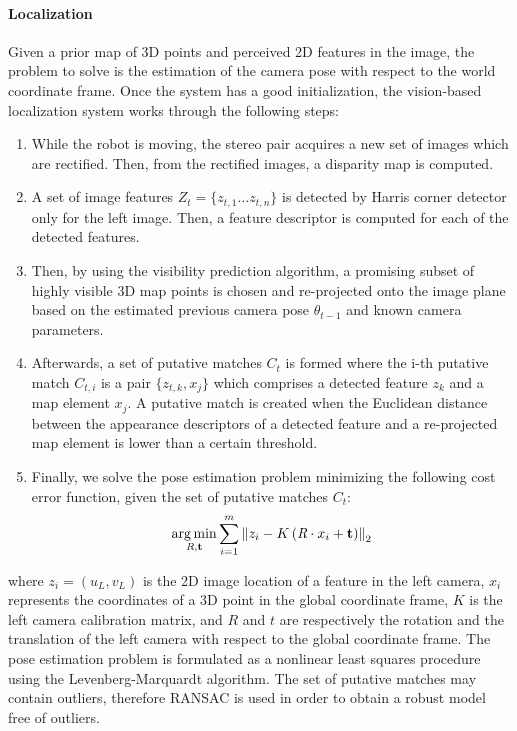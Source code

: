 \paragraph{Localization}
Given a prior map of 3D points and perceived 2D features in the image,
the problem to solve is the estimation of the camera pose with respect
to the world coordinate frame. Once the system has a good
initialization, the vision-based localization system works through the
following steps:
%
\begin{enumerate}
\item While the robot is moving, the stereo pair acquires a new set of images which are rectified. Then, from the rectified images, a disparity map is computed.
\item A set of image features $Z_{t}=\{z_{t,1} \ldots z_{t,n}\}$ is detected by Harris corner detector only for the left image. Then, a feature descriptor is computed for each of the detected features.
\item Then, by using the visibility prediction algorithm, a promising subset of highly visible 3D map points is chosen and re-projected onto the image plane based on the estimated previous camera pose $\theta_{t-1}$ and known camera parameters.
\item Afterwards, a set of putative matches $C_{t}$ is formed where the i-th putative match $C_{t,i}$ is a pair $\{z_{t,k},x_{j}\}$ which comprises a detected feature $z_{k}$ and a map element $x_{j}$. A putative match is created when the Euclidean distance between the appearance descriptors of a detected feature and a re-projected map element is lower than a certain threshold.
\item Finally, we solve the pose estimation problem minimizing the following cost error function, given the set of putative matches $C_{t}$:
%
\begin{equation} \label{eq:pose_estimation}
\argmin \limits_{\emph{R},\mathbf{t}} \sum \limits_{i=1}^{m} \left\|z_{i} - K \left(\emph{R}\cdot x_{i} + \mathbf{t} \right)\right\|_{2}
\end{equation}
%
\end{enumerate}
%
where $z_{i}=\left(u_{L},v_{L}\right)$ is the 2D image location of a feature in the left camera, $x_{i}$ represents the coordinates of a 3D point in the global coordinate frame, $K$ is the left camera calibration matrix, and $R$ and $t$ are respectively the rotation and the translation of the left camera with respect to the global coordinate frame. The pose estimation problem is formulated as a nonlinear least squares procedure using the Levenberg-Marquardt algorithm. The set of putative matches may contain outliers, therefore RANSAC is used in order to obtain a robust model free of outliers.


